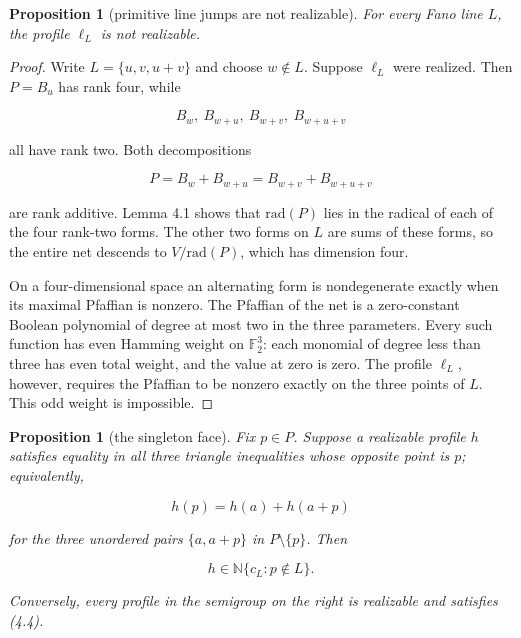 \documentclass[11pt]{article}
\newtheorem{proposition}[theorem]{Proposition}
\theoremstyle{remark}
\numberwithin{equation}{section}
\begin{document}
\Needspace{0.28\textheight}
\begin{proposition}[primitive line jumps are not realizable]

For every Fano line $L$, the profile $\ell_L$ is not realizable.

\end{proposition}

\begin{proof}

Write $L=\{u,v,u+v\}$ and choose $w\notin L$. Suppose $\ell_L$ were realized.
Then $P=B_u$ has rank four, while

\nopagebreak[4]
\[
B_w,\ B_{w+u},\ B_{w+v},\ B_{w+u+v}
\]

all have rank two. Both decompositions

\nopagebreak[4]
\[
P=B_w+B_{w+u}=B_{w+v}+B_{w+u+v}
\tag{4.3}
\]

are rank additive. Lemma 4.1 shows that $\mathrm{rad}(P)$ lies in the radical
of each of the four rank-two forms. The other two forms on $L$ are sums of
these forms, so the entire net descends to $V/\mathrm{rad}(P)$, which has
dimension four.

On a four-dimensional space an alternating form is nondegenerate exactly when
its maximal Pfaffian is nonzero. The Pfaffian of the net is a zero-constant
Boolean polynomial of degree at most two in the three parameters. Every such
function has even Hamming weight on $\mathbb F_2^3$: each monomial of degree
less than three has even total weight, and the value at zero is zero. The
profile $\ell_L$, however, requires the Pfaffian to be nonzero exactly on the
three points of $L$. This odd weight is impossible.
\end{proof}


\Needspace{0.28\textheight}
\begin{proposition}[the singleton face]

Fix $p\in P$. Suppose a realizable profile $h$ satisfies equality in all three
triangle inequalities whose opposite point is $p$; equivalently,

\nopagebreak[4]
\[
h(p)=h(a)+h(a+p)
\tag{4.4}
\]

for the three unordered pairs $\{a,a+p\}$ in $P\setminus\{p\}$. Then

\nopagebreak[4]
\[
h\in\mathbb N\{c_L:p\notin L\}.
\tag{4.5}
\]

Conversely, every profile in the semigroup on the right is realizable and
satisfies (4.4).

\end{proposition}
\end{document}
